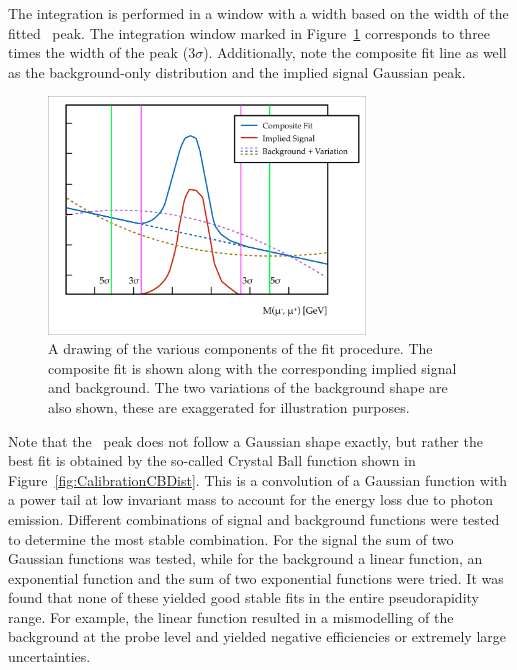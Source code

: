 The integration is performed in a window with a width based on the width of the fitted \jpsi\ peak. The integration window marked in Figure~\ref{fig:CalibrationFittingExample} corresponds to three times the width of the peak ($3\sigma$). Additionally, note the composite fit line as well as the background-only distribution and the implied signal Gaussian peak.

\begin{figure}[htbp]
  \centering
    \includegraphics[width=0.75\textwidth]{PartCalibration2012/Plots/FittingExample.pdf}
    \caption[A drawing of the various components of the fit procedure.]{A drawing of the various components of the fit procedure. The composite fit is shown along with the corresponding implied signal and background. The two variations of the background shape are also shown, these are exaggerated for illustration purposes.} 
  \label{fig:CalibrationFittingExample}
\end{figure}

Note that the \jpsi\ peak does not follow a Gaussian shape exactly, but rather the best fit is obtained by the so-called Crystal Ball function shown in Figure~\ref{fig:CalibrationCBDist}. This is a convolution of a Gaussian function with a power tail at low invariant mass to account for the energy loss due to photon emission. Different combinations of signal and background functions were tested to determine the most stable combination. For the signal the sum of two Gaussian functions was tested, while for the background a linear function, an exponential function and the sum of two exponential functions were tried. It was found that none of these yielded good stable fits in the entire pseudorapidity range. For example, the linear function resulted in a mismodelling of the background at the probe level and yielded negative efficiencies or extremely large uncertainties.

